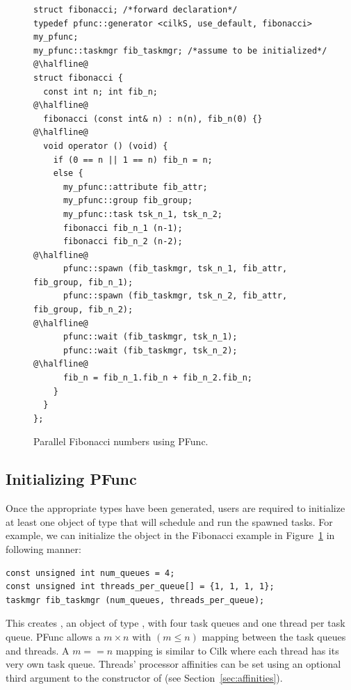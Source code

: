 \documentclass{sig-alternate}
\begin{document}
\begin{figure}[t]
\begin{center}
\begin{lstlisting}[frame=lrtb]
struct fibonacci; /*forward declaration*/
typedef pfunc::generator <cilkS, use_default, fibonacci> my_pfunc;
my_pfunc::taskmgr fib_taskmgr; /*assume to be initialized*/
@\halfline@
struct fibonacci {
  const int n; int fib_n;
@\halfline@
  fibonacci (const int& n) : n(n), fib_n(0) {}
@\halfline@
  void operator () (void) {
    if (0 == n || 1 == n) fib_n = n;
    else { 
      my_pfunc::attribute fib_attr;
      my_pfunc::group fib_group;
      my_pfunc::task tsk_n_1, tsk_n_2;
      fibonacci fib_n_1 (n-1);
      fibonacci fib_n_2 (n-2);
@\halfline@
      pfunc::spawn (fib_taskmgr, tsk_n_1, fib_attr, fib_group, fib_n_1);
      pfunc::spawn (fib_taskmgr, tsk_n_2, fib_attr, fib_group, fib_n_2);
@\halfline@
      pfunc::wait (fib_taskmgr, tsk_n_1);
      pfunc::wait (fib_taskmgr, tsk_n_2);
@\halfline@
      fib_n = fib_n_1.fib_n + fib_n_2.fib_n;
    }
  } 
};
\end{lstlisting}
\caption{Parallel Fibonacci numbers using PFunc.}
\label{fig:hello_world}
\end{center}
\end{figure}


\subsection{Initializing PFunc}
\label{sec:initializing}
Once the appropriate types have been generated, users are required to
initialize at least one object of type  that will
schedule and run the spawned tasks. For example, we can initialize the
 object in the Fibonacci example in
Figure~\ref{fig:hello_world} in following manner:

\begin{lstlisting}
const unsigned int num_queues = 4; 
const unsigned int threads_per_queue[] = {1, 1, 1, 1}; 
taskmgr fib_taskmgr (num_queues, threads_per_queue);
\end{lstlisting}

This creates , an object of type , with four
task queues and one thread per task queue. PFunc allows a $m\times{}n$ with
$(m\le{}n)$ mapping between the task queues and threads. A $m==n$ mapping is
similar to Cilk where each thread has its very own task queue. Threads'
processor affinities can be set using an optional third argument to the
constructor of  (see Section~\ref{sec:affinities}).
\end{document}
